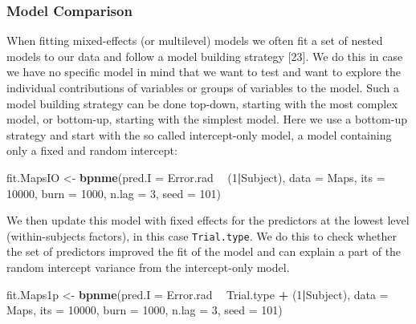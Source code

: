 \documentclass[11pt,]{article}
\newenvironment{Shaded}{\begin{snugshade}}{\end{snugshade}}
\newcommand{\DataTypeTok}[1]{\textcolor[rgb]{0.13,0.29,0.53}{#1}}
\newcommand{\DecValTok}[1]{\textcolor[rgb]{0.00,0.00,0.81}{#1}}
\newcommand{\KeywordTok}[1]{\textcolor[rgb]{0.13,0.29,0.53}{\textbf{#1}}}
\newcommand{\NormalTok}[1]{#1}
\newcommand{\OperatorTok}[1]{\textcolor[rgb]{0.81,0.36,0.00}{\textbf{#1}}}
\newcommand{\StringTok}[1]{\textcolor[rgb]{0.31,0.60,0.02}{#1}}
\begin{document}
\subsubsection{Model Comparison}\label{fitme}

When fitting mixed-effects (or multilevel) models we often fit a set of
nested models to our data and follow a model building strategy {[}23{]}.
We do this in case we have no specific model in mind that we want to
test and want to explore the individual contributions of variables or
groups of variables to the model. Such a model building strategy can be
done top-down, starting with the most complex model, or bottom-up,
starting with the simplest model. Here we use a bottom-up strategy and
start with the so called intercept-only model, a model containing only a
fixed and random intercept:

\begin{Shaded}
\begin{Highlighting}[]
\NormalTok{fit.MapsIO <-}\StringTok{ }\KeywordTok{bpnme}\NormalTok{(}\DataTypeTok{pred.I =}\NormalTok{ Error.rad }\OperatorTok{~}\StringTok{ }\NormalTok{(}\DecValTok{1}\OperatorTok{|}\NormalTok{Subject),}
                    \DataTypeTok{data =}\NormalTok{ Maps,}
                    \DataTypeTok{its =} \DecValTok{10000}\NormalTok{, }\DataTypeTok{burn =} \DecValTok{1000}\NormalTok{, }\DataTypeTok{n.lag =} \DecValTok{3}\NormalTok{, }\DataTypeTok{seed =} \DecValTok{101}\NormalTok{)}
\end{Highlighting}
\end{Shaded}

We then update this model with fixed effects for the predictors at the
lowest level (within-subjects factors), in this case \verb|Trial.type|.
We do this to check whether the set of predictors improved the fit of
the model and can explain a part of the random intercept variance from
the intercept-only model.

\begin{Shaded}
\begin{Highlighting}[]
\NormalTok{fit.Maps1p <-}\StringTok{ }\KeywordTok{bpnme}\NormalTok{(}\DataTypeTok{pred.I =}\NormalTok{ Error.rad }\OperatorTok{~}\StringTok{ }\NormalTok{Trial.type }\OperatorTok{+}\StringTok{ }\NormalTok{(}\DecValTok{1}\OperatorTok{|}\NormalTok{Subject),}
                    \DataTypeTok{data =}\NormalTok{ Maps,}
                    \DataTypeTok{its =} \DecValTok{10000}\NormalTok{, }\DataTypeTok{burn =} \DecValTok{1000}\NormalTok{, }\DataTypeTok{n.lag =} \DecValTok{3}\NormalTok{, }\DataTypeTok{seed =} \DecValTok{101}\NormalTok{)}
\end{Highlighting}
\end{Shaded}
\end{document}
